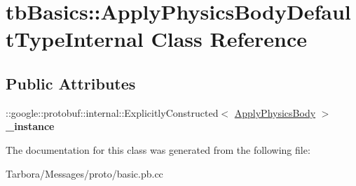 \hypertarget{classtbBasics_1_1ApplyPhysicsBodyDefaultTypeInternal}{}\section{tb\+Basics\+:\+:Apply\+Physics\+Body\+Default\+Type\+Internal Class Reference}
\label{classtbBasics_1_1ApplyPhysicsBodyDefaultTypeInternal}
\subsection*{Public Attributes}
\begin{DoxyCompactItemize}
\item 
\mbox{\label{classtbBasics_1_1ApplyPhysicsBodyDefaultTypeInternal_a8bfcdf4b6f23a98a324972fe16266a42}} 
\+::google\+::protobuf\+::internal\+::\+Explicitly\+Constructed$<$ \hyperlink{classtbBasics_1_1ApplyPhysicsBody}{Apply\+Physics\+Body} $>$ {\bfseries \+\_\+instance}
\end{DoxyCompactItemize}


The documentation for this class was generated from the following file\+:\begin{DoxyCompactItemize}
\item 
Tarbora/\+Messages/proto/basic.\+pb.\+cc\end{DoxyCompactItemize}
